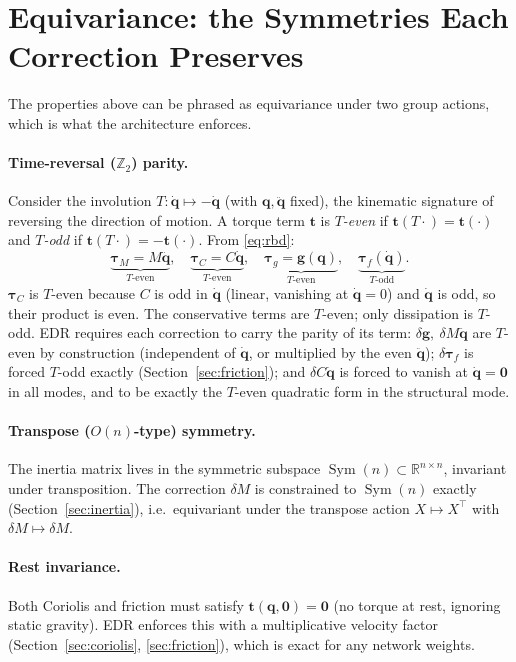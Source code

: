 \documentclass[11pt]{article}
\newcommand{\R}{\mathbb{R}}
\newcommand{\q}{\bm{q}}
\newcommand{\qd}{\dot{\bm{q}}}
\newcommand{\qdd}{\ddot{\bm{q}}}
\newcommand{\tg}{\bm{\tau}_g}
\newcommand{\tM}{\bm{\tau}_M}
\newcommand{\tC}{\bm{\tau}_C}
\newcommand{\tf}{\bm{\tau}_f}
\newcommand{\dg}{\delta\bm{g}}
\newcommand{\dM}{\delta\!M}
\newcommand{\dC}{\delta C}
\newcommand{\dtf}{\delta\bm{\tau}_f}
\newcommand{\Mmat}{M}
\newcommand{\Cmat}{C}
\newcommand{\transp}{^{\top}}
\DeclareMathOperator{\Symop}{Sym}
\theoremstyle{definition}
\theoremstyle{plain}
\begin{document}
\section{Equivariance: the Symmetries Each Correction Preserves}
\label{sec:equivariance}
The properties above can be phrased as equivariance under two group actions, which
is what the architecture enforces.

\paragraph{Time-reversal ($\mathbb{Z}_2$) parity.}
Consider the involution $T:\qd\mapsto-\qd$ (with $\q,\qdd$ fixed), the kinematic
signature of reversing the direction of motion. A torque term $\bm t$ is
\emph{$T$-even} if $\bm t(T\!\cdot)=\bm t(\cdot)$ and \emph{$T$-odd} if
$\bm t(T\!\cdot)=-\bm t(\cdot)$. From \eqref{eq:rbd}:
\begin{equation}
\underbrace{\tM=\Mmat\qdd}_{T\text{-even}},\quad
\underbrace{\tC=\Cmat\qd}_{T\text{-even}},\quad
\underbrace{\tg=\bm g(\q)}_{T\text{-even}},\quad
\underbrace{\tf(\qd)}_{T\text{-odd}} .
\end{equation}
$\tC$ is $T$-even because $\Cmat$ is odd in $\qd$ (linear, vanishing at $\qd=0$)
and $\qd$ is odd, so their product is even. The conservative terms are $T$-even;
only dissipation is $T$-odd. EDR requires each correction to carry the parity of
its term: $\dg,\ \dM\qdd$ are $T$-even by construction (independent of $\qd$, or
multiplied by the even $\qdd$); $\dtf$ is forced $T$-odd exactly
(Section~\ref{sec:friction}); and $\dC\qd$ is forced to vanish at $\qd=\bm 0$ in
all modes, and to be exactly the $T$-even quadratic form in the structural mode.

\paragraph{Transpose ($O(n)$-type) symmetry.}
The inertia matrix lives in the symmetric subspace $\Symop(n)\subset\R^{n\times n}$,
invariant under transposition. The correction $\dM$ is constrained to
$\Symop(n)$ exactly (Section~\ref{sec:inertia}), i.e.\ equivariant under the
transpose action $X\mapsto X\transp$ with $\dM\mapsto\dM$.

\paragraph{Rest invariance.}
Both Coriolis and friction must satisfy $\bm t(\q,\bm 0)=\bm 0$ (no torque at
rest, ignoring static gravity). EDR enforces this with a multiplicative velocity
factor (Section~\ref{sec:coriolis}, \ref{sec:friction}), which is exact for any
network weights.
\end{document}
